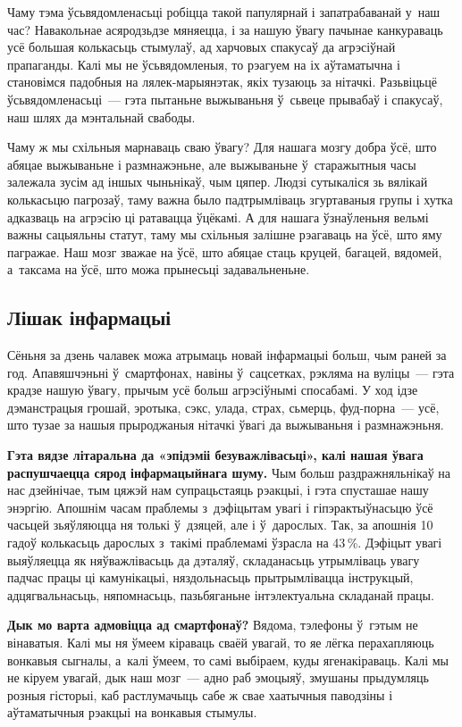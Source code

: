 Чаму тэма ўсьвядомленасьці робіцца такой папулярнай і запатрабаванай у~наш час? Навакольнае асяродзьдзе мяняецца, і за нашую ўвагу пачынае канкураваць усё большая колькасьць стымулаў, ад харчовых спакусаў да агрэсіўнай прапаганды. Калі мы не ўсьвядомленыя, то рэагуем на іх аўтаматычна і становімся падобныя на лялек-марыянэтак, якіх тузаюць за нітачкі. Разьвіцьцё ўсьвядомленасьці~--- гэта пытаньне выжываньня ў~сьвеце прывабаў і спакусаў, наш шлях да мэнтальнай свабоды.

Чаму ж мы схільныя марнаваць сваю ўвагу? Для нашага мозгу добра ўсё, што абяцае выжываньне і размнажэньне, але выжываньне ў~старажытныя часы залежала зусім ад іншых чыньнікаў, чым цяпер. Людзі сутыкаліся зь вялікай колькасьцю пагрозаў, таму важна было падтрымліваць згуртаваныя групы і хутка адказваць на агрэсію ці ратавацца ўцёкамі. А для нашага ўзнаўленьня вельмі важны сацыяльны статут, таму мы схільныя залішне рэагаваць на ўсё, што яму пагражае. Наш мозг зважае на ўсё, што абяцае стаць круцей, багацей, вядомей, а~таксама на ўсё, што можа прынесьці задавальненьне.

\subsection*{Лішак інфармацыі}

Сёньня за дзень чалавек можа атрымаць новай інфармацыі больш, чым раней за год. Апавяшчэньні ў~смартфонах, навіны ў~сацсетках, рэкляма на вуліцы~--- гэта крадзе нашую ўвагу, прычым усё больш агрэсіўнымі спосабамі. У ход ідзе дэманстрацыя грошай, эротыка, сэкс, улада, страх, сьмерць, фуд-порна~--- усё, што тузае за нашыя прыроджаныя нітачкі ўвагі да выжываньня і размнажэньня.

\textbf{Гэта вядзе літаральна да «эпідэміі безуважлівасьці», калі нашая ўвага распушчаецца сярод інфармацыйнага шуму.} Чым больш раздражняльнікаў на нас дзейнічае, тым цяжэй нам супрацьстаяць рэакцыі, і гэта спусташае нашу энэргію. Апошнім часам праблемы з~дэфіцытам увагі і гіпэрактыўнасьцю ўсё часьцей зьяўляюцца ня толькі ў~дзяцей, але і ў~дарослых. Так, за апошнія 10 гадоў колькасьць дарослых з~такімі праблемамі ўзрасла на 43\,\%. Дэфіцыт увагі выяўляецца як няўважлівасьць да дэталяў, складанасьць утрымліваць увагу падчас працы ці камунікацыі, няздольнасьць прытрымлівацца інструкцый, адцягвальнасьць, няпомнасьць, пазьбяганьне інтэлектуальна складанай працы.

\textbf{Дык мо варта адмовіцца ад смартфонаў?} Вядома, тэлефоны ў~гэтым не вінаватыя. Калі мы ня ўмеем кіраваць сваёй увагай, то яе лёгка перахапляюць вонкавыя сыгналы, а~калі ўмеем, то самі выбіраем, куды ягенакіраваць. Калі мы не кіруем увагай, дык наш мозг~--- адно раб эмоцыяў, змушаны прыдумляць розныя гісторыі, каб растлумачыць сабе ж свае хаатычныя паводзіны і аўтаматычныя рэакцыі на вонкавыя стымулы.

